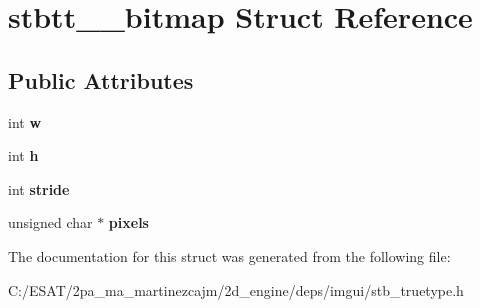 \hypertarget{structstbtt____bitmap}{}\section{stbtt\+\_\+\+\_\+bitmap Struct Reference}
\label{structstbtt____bitmap}
\subsection*{Public Attributes}
\begin{DoxyCompactItemize}
\item 
\mbox{\label{structstbtt____bitmap_afbd607426f0a457b1a871ed902eeb926}} 
int {\bfseries w}
\item 
\mbox{\label{structstbtt____bitmap_a2afc802e26e9f1dda897ac16ecfff10e}} 
int {\bfseries h}
\item 
\mbox{\label{structstbtt____bitmap_a48ee6b550ee4f1d85bfc32c62c0e9a98}} 
int {\bfseries stride}
\item 
\mbox{\label{structstbtt____bitmap_ae6be77625faf55b110eaaffde5c7733c}} 
unsigned char $\ast$ {\bfseries pixels}
\end{DoxyCompactItemize}


The documentation for this struct was generated from the following file\+:\begin{DoxyCompactItemize}
\item 
C\+:/\+E\+S\+A\+T/2pa\+\_\+ma\+\_\+martinezcajm/2d\+\_\+engine/deps/imgui/stb\+\_\+truetype.\+h\end{DoxyCompactItemize}
